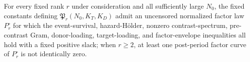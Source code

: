 For every fixed rank \(r\) under consideration and all sufficiently large \(N_0\), the fixed constants defining \(\mathfrak P_r(N_0,K_T,K_D)\) admit an uncensored normalized factor law \(P_r^\circ\) for which the event-survival, hazard-Hölder, nonzero contrast-spectrum, pre-contrast Gram, donor-loading, target-loading, and factor-envelope inequalities all hold with a fixed positive slack; when \(r\ge2\), at least one post-period factor curve of \(P_r^\circ\) is not identically zero.